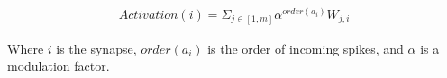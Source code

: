     \begin{align}
        Activation(i) = \Sigma_{j \in [1,m]}\alpha^{order(a_i)}W_{j,i} \label{eq:roc_activation}
    \end{align}

    Where $i$ is the synapse, $order(a_i)$ is the order of incoming spikes, and
    $\alpha$ is a modulation factor.
    
    
    
    
